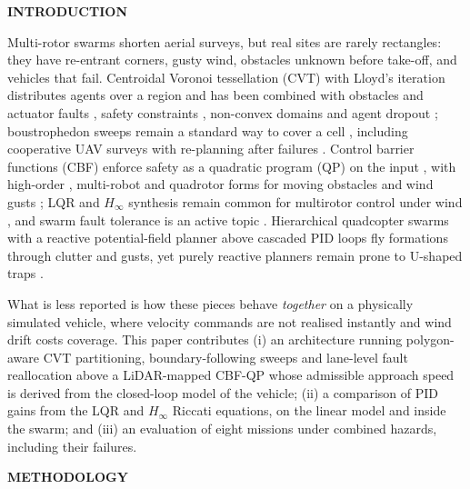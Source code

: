 \documentclass[10pt,letterpaper]{article}
\newif\ifafterheadone
\newcommand{\headingone}[1]{\par\addpenalty{-200}\vspace{8pt}%
    {\centering\fontsize{12}{14}\selectfont\bfseries\MakeUppercase{#1}\par}%
    \nopagebreak\vspace{3pt}\nopagebreak\global\afterheadonetrue\noindent\ignorespaces}
\begin{document}
\headingone{Introduction}
Multi-rotor swarms shorten aerial surveys, but real sites are rarely rectangles: they have
re-entrant corners, gusty wind, obstacles unknown before take-off, and vehicles that fail.
Centroidal Voronoi tessellation (CVT) with Lloyd's iteration \cite{lloydLeastSquaresQuantization1982}
distributes agents over a region and has been combined with obstacles and actuator faults
\cite{baiAdaptiveCoverageObstacle2022}, safety constraints \cite{baiSafeAdaptiveCoverage2023},
non-convex domains \cite{caoDistributedWeightedCoverage2023} and agent dropout
\cite{leeAdaptiveCentroidalVoronoi2024}; boustrophedon sweeps remain a standard way to cover a cell
\cite{tanCoveragePathPlanningReview2021,huRoutePlanning2021}, including cooperative UAV surveys
\cite{fevgasCoveragePathPlanningUAV2022} with re-planning after failures
\cite{lunaMultiUAVReplanning2024}. Control barrier functions (CBF) enforce safety as a quadratic
program (QP) on the input \cite{amesControlBarrierFunction2017,hsuSafetyFilter2024}, with
high-order \cite{xiaoHighOrderCBF2022}, multi-robot \cite{gargLearningSafeMultiRobot2024} and
quadrotor forms for moving obstacles \cite{tayalCollisionConeUAV2024} and wind gusts
\cite{abichandaniMultiQuadrotorWind2023}; LQR and $H_\infty$ synthesis \cite{doyleStateSpaceHinf1989} remain common for multirotor
control under wind \cite{zyadatQuadplaneWind2023}, and swarm fault
tolerance is an active topic \cite{okeeffeAnticipatingDegradation2025}. Hierarchical quadcopter
swarms with a reactive potential-field planner above cascaded PID loops fly formations through
clutter and gusts, yet purely reactive planners remain prone to U-shaped traps
\cite{herdianFormationIAPFERC2026}.

What is less reported is how these pieces behave \emph{together} on a physically simulated
vehicle, where velocity commands are not realised instantly and wind drift costs coverage. This
paper contributes (i) an architecture running polygon-aware CVT partitioning, boundary-following
sweeps and lane-level fault reallocation above a LiDAR-mapped CBF-QP whose admissible approach
speed is derived from the closed-loop model of the vehicle; (ii) a comparison of PID gains
from the LQR and $H_\infty$ Riccati equations, on the linear model and inside the swarm; and
(iii) an evaluation of eight missions under combined hazards, including their failures.

\headingone{Methodology}
\end{document}
